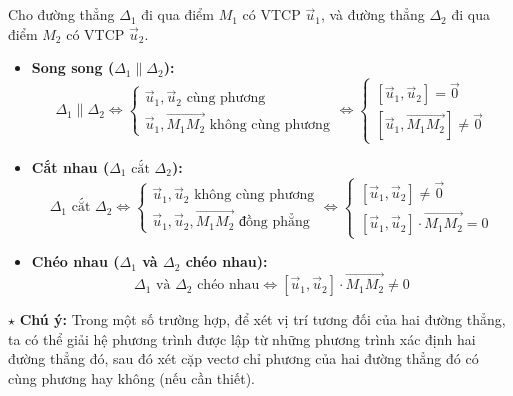 \documentclass[12pt,a4paper]{extarticle}
\begin{document}
\section*{\color{myblue}{II. Vị trí tương đối của hai đường thẳng}}
Cho đường thẳng $\Delta_1$ đi qua điểm $M_1$ có VTCP $\vec{u}_1$, và đường thẳng $\Delta_2$ đi qua điểm $M_2$ có VTCP $\vec{u}_2$.
\begin{tcolorbox}[colback=lightblue, colframe=myblue, arc=2mm]
\begin{itemize}
    \item[\textbf{1.}] \textbf{Song song ($\Delta_1 \parallel \Delta_2$):}
    \[
    \Delta_1 \parallel \Delta_2 \iff 
    \begin{cases}
    \vec{u}_1, \vec{u}_2 \text{ cùng phương} \\
    \vec{u}_1, \vec{M_1M_2} \text{ không cùng phương}
    \end{cases}
    \iff
    \begin{cases}
    [\vec{u}_1, \vec{u}_2] = \vec{0} \\
    [\vec{u}_1, \vec{M_1M_2}] \neq \vec{0}
    \end{cases}
    \]
    \item[\textbf{2.}] \textbf{Cắt nhau ($\Delta_1 \text{ cắt } \Delta_2$):}
    \[
    \Delta_1 \text{ cắt } \Delta_2 \iff 
    \begin{cases}
    \vec{u}_1, \vec{u}_2 \text{ không cùng phương} \\
    \vec{u}_1, \vec{u}_2, \vec{M_1M_2} \text{ đồng phẳng}
    \end{cases}
    \iff
    \begin{cases}
    [\vec{u}_1, \vec{u}_2] \neq \vec{0} \\
    [\vec{u}_1, \vec{u}_2] \cdot \vec{M_1M_2} = 0
    \end{cases}
    \]
    \item[\textbf{3.}] \textbf{Chéo nhau ($\Delta_1$ và $\Delta_2$ chéo nhau):}
    \[
    \Delta_1 \text{ và } \Delta_2 \text{ chéo nhau} \iff [\vec{u}_1, \vec{u}_2] \cdot \vec{M_1M_2} \neq 0
    \]
\end{itemize}
\end{tcolorbox}
\noindent $\star$ \textbf{Chú ý:} Trong một số trường hợp, để xét vị trí tương đối của hai đường thẳng, ta có thể giải hệ phương trình được lập từ những phương trình xác định hai đường thẳng đó, sau đó xét cặp vectơ chỉ phương của hai đường thẳng đó có cùng phương hay không (nếu cần thiết).
\section*{\color{myblue}{III. Góc}}
\end{document}
